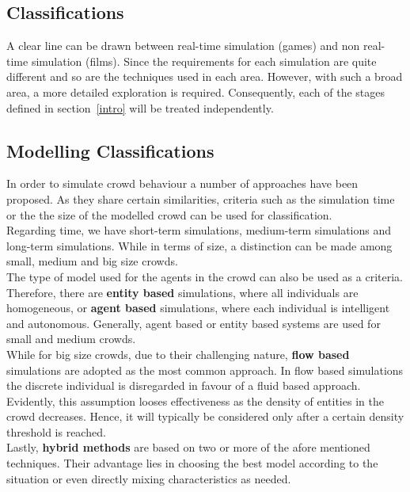 \documentclass[6pt]{article} %
\begin{document}
\begin{multicols}{2}
\section{Classifications}

A clear line can be drawn between real-time simulation (games) and non real-time simulation (films).
Since the requirements for each simulation are quite different and so are the techniques used in each area.
However, with such a broad area, a more detailed exploration is required.
Consequently, each of the stages defined in section~\ref{intro} will be treated independently.

\subsection{Modelling Classifications}
\label{subsec:ModelClassification}

In order to simulate crowd behaviour a number of approaches have been proposed.
As they share certain similarities, criteria such as the simulation time or the the size of the modelled crowd can be used for classification.\\

Regarding time, we have short-term simulations, medium-term simulations and long-term simulations.
While in terms of size, a distinction can be made among small, medium and big size crowds.\\

The type of model used for the agents in the crowd can also be used as a criteria.
Therefore, there are \textbf{entity based} simulations, where all individuals are homogeneous, or \textbf{agent based} simulations, where each individual is intelligent and autonomous.
Generally, agent based or entity based systems are used for small and medium crowds.\\

While for big size crowds, due to their challenging nature, \textbf{flow based} simulations are adopted as the most common approach.
In flow based simulations the discrete individual is disregarded in favour of a fluid based approach.
Evidently, this assumption looses effectiveness as the density of entities in the crowd decreases.
Hence, it will typically be considered only after a certain density threshold is reached.\\

Lastly, \textbf{hybrid methods} are based on two or more of the afore mentioned techniques.
Their advantage lies in choosing the best model according to the situation or even directly mixing characteristics as needed. 


\end{multicols}
\end{document}

